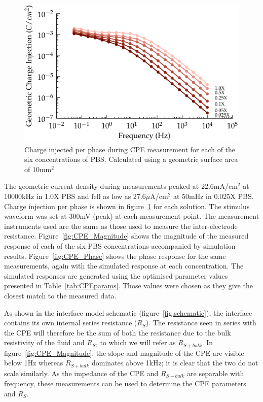 \documentclass[journal, a4paper]{IEEEtran}
\begin{document}
\begin{figure}
    \begin{center}
        \includegraphics{graphics/chargeInjectionVsFrequency_magnitude}
    \end{center}
    \caption{Charge injected per phase during CPE measurement for each of the six concentrations of PBS. Calculated using a geometric surface area of 10\thinspace mm$^{2}$}
    \label{fig:chargeInjectionVsFrequency}
\end{figure}

The geometric current density during measurements peaked at 22.6\thinspace mA/cm$^{2}$ at 10000\thinspace kHz in 1.0X PBS and fell as low as 27.6\thinspace $\mu$A/cm$^{2}$ at 50\thinspace mHz in 0.025X PBS. Charge injection per phase is shown in figure~\ref{fig:chargeInjectionVsFrequency} for each solution.
The stimulus waveform was set at 300\thinspace mV (peak) at each measurement point. The measurement instruments used are the same as those used to measure the inter-electrode resistance.
Figure~\ref{fig:CPE_Magnitude} shows the magnitude of the measured response of each of the six PBS concentrations accompanied by simulation results. Figure~\ref{fig:CPE_Phase} shows the phase response for the same measurements, again with the simulated response at each concentration. The simulated responses are generated using the optimised parameter values presented in Table~\ref{tab:CPEparams}. Those values were chosen as they give the closest match to the measured data.

As shown in the interface model schematic (figure~\ref{fig:schematic}), the interface contains its own internal series resistance ($R_{S}$). The resistance seen in series with the CPE will therefore be the sum of both the resistance due to the bulk resistivity of the fluid and $R_{S}$, to which we will refer as $R_{S+bulk}$.
In figure~\ref{fig:CPE_Magnitude}, the slope and magnitude of the CPE are visible below 1\thinspace Hz whereas $R_{S+bulk}$  dominates above 1\thinspace kHz; it is clear that the two do not scale similarly.
As the impedance of the CPE and $R_{S+bulk}$ are separable with frequency, these measurements can be used to determine the CPE parameters and $R_{S}$.
\end{document}
